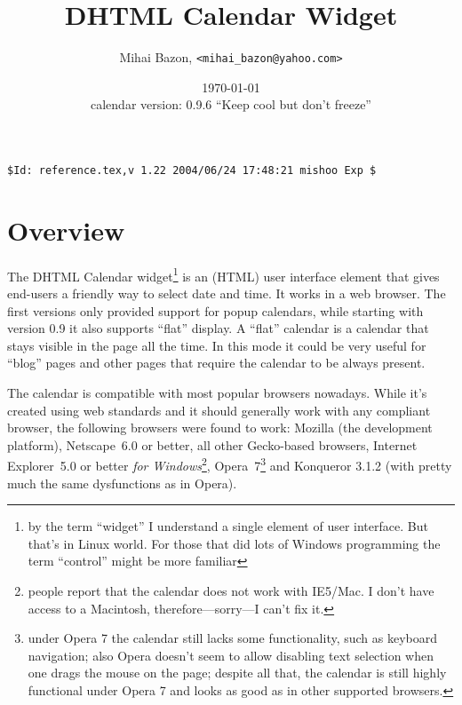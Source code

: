 \documentclass[a4paper,10pt]{article}
\title{DHTML Calendar Widget}
\author{Mihai Bazon, \texttt{<mihai\_bazon@yahoo.com>}}
\date{\today\\\vspace{0.2ex}
{\small calendar version: 0.9.6 ``Keep cool but don't freeze''}
}
\begin{document}
\maketitle

{\small\verb|$Id: reference.tex,v 1.22 2004/06/24 17:48:21 mishoo Exp $|}
{\begin{small}\begin{quote}
{\begin{flushright}
\noindent
\end{flushright}}
\end{quote}\end{small}}
\tableofcontents


\section{Overview}

The DHTML Calendar widget\footnote
        {
        by the term ``widget'' I understand a single element of user interface.
        But that's in Linux world.  For those that did lots of Windows
        programming the term ``control'' might be more familiar
        }
is an (HTML) user interface element that gives end-users a friendly way to
select date and time.  It works in a web browser.  The first versions only provided
support for popup calendars, while starting with version 0.9 it also supports
``flat'' display.  A ``flat'' calendar is a calendar that stays visible in the
page all the time.  In this mode it could be very useful for ``blog'' pages and
other pages that require the calendar to be always present.

The calendar is compatible with most popular browsers nowadays.  While it's
created using web standards and it should generally work with any compliant
browser, the following browsers were found to work: Mozilla (the
development platform), Netscape~6.0 or better, all other Gecko-based browsers,
Internet Explorer~5.0 or better \emph{for Windows}\footnote{people report that the calendar does
not work with IE5/Mac.  I don't have access to a Macintosh,
therefore---sorry---I can't fix it.}, Opera~7\footnote
        { under Opera 7 the calendar still lacks some functionality, such as
        keyboard navigation; also Opera doesn't seem to allow disabling text
        selection when one drags the mouse on the page; despite all that, the
        calendar is still highly functional under Opera 7 and looks as good as
        in other supported browsers. } and Konqueror 3.1.2 (with pretty much the
same dysfunctions as in Opera).
\end{document}
